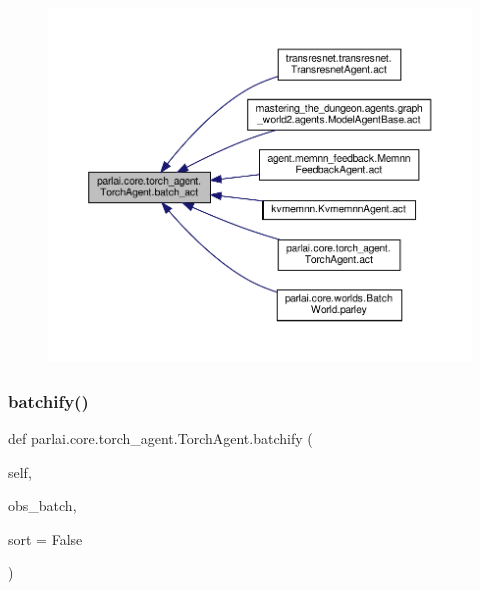 \begin{figure}[H]
\begin{center}
\leavevmode
\includegraphics[width=350pt]{classparlai_1_1core_1_1torch__agent_1_1TorchAgent_a7754a74d6c87590f46e71ec486c285a8_icgraph}
\end{center}
\end{figure}
\mbox{\label{classparlai_1_1core_1_1torch__agent_1_1TorchAgent_a4c5824776df0c6cf995984a5e7a3f433}} 
\subsubsection{\texorpdfstring{batchify()}{batchify()}}
{\footnotesize\ttfamily def parlai.\+core.\+torch\+\_\+agent.\+Torch\+Agent.\+batchify (\begin{DoxyParamCaption}\item[{}]{self,  }\item[{}]{obs\+\_\+batch,  }\item[{}]{sort = {\ttfamily False} }\end{DoxyParamCaption})}

